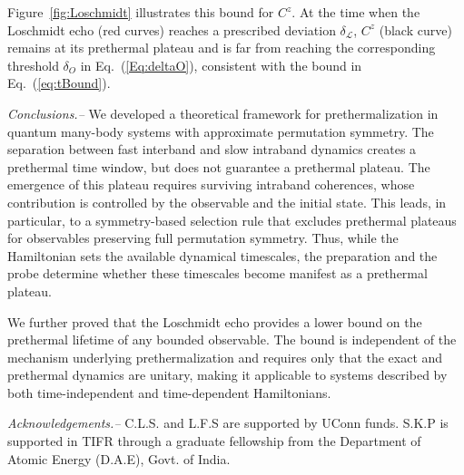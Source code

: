 \documentclass[aps,prl,amsfonts,floatfix,superscriptaddress,longbibliography,twocolumn,footinbib]{revtex4-2}
\begin{document}
Figure~\ref{fig:Loschmidt} illustrates this bound for $C^z$. At the time when the Loschmidt echo (red curves) reaches a prescribed deviation $\delta_{\mathcal L}$, $C^z$ (black curve) remains at its prethermal plateau and is far from reaching the corresponding threshold $\delta_O$ in Eq.~(\ref{Eq:deltaO}), consistent with the bound in Eq.~(\ref{eq:tBound}).


{\em Conclusions.--} We developed a theoretical framework for prethermalization in quantum many-body systems with approximate permutation symmetry. The separation between fast interband and slow intraband dynamics creates a prethermal time window, but does not guarantee a prethermal plateau. The emergence of this plateau requires surviving intraband coherences, whose contribution is controlled by the observable and the initial state. This leads, in particular, to a symmetry-based selection rule that excludes prethermal plateaus for observables preserving full permutation symmetry. Thus, while the Hamiltonian sets the available dynamical timescales, the preparation and the probe determine whether these timescales become manifest as a prethermal plateau.


We further proved that the Loschmidt echo provides a lower bound on the prethermal lifetime of any bounded observable. The bound is independent of the mechanism underlying prethermalization and requires only that the exact and prethermal dynamics are unitary, making it applicable to systems described by both time-independent and time-dependent Hamiltonians.

{\em Acknowledgements.--} C.L.S. and L.F.S are supported by UConn funds. S.K.P is supported in TIFR through a graduate fellowship from the Department of Atomic Energy (D.A.E),
Govt. of India.




\end{document}
